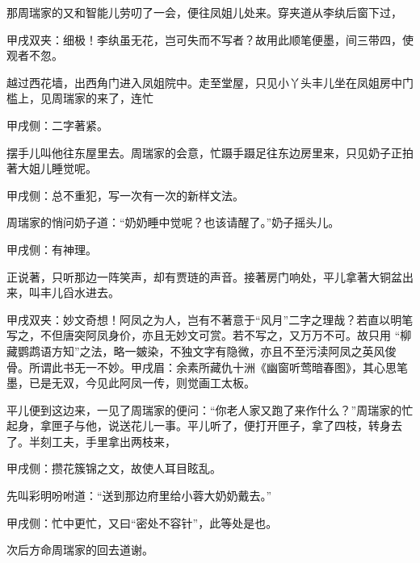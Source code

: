 \begin{parag}
    那周瑞家的又和智能儿劳叨了一会，便往凤姐儿处来。穿夹道从李纨后窗下过，\begin{note}甲戌双夹：细极！李纨虽无花，岂可失而不写者？故用此顺笔便墨，间三带四，使观者不忽。\end{note}越过西花墙，出西角门进入凤姐院中。走至堂屋，只见小丫头丰儿坐在凤姐房中门槛上，见周瑞家的来了，连忙\begin{note}甲戌侧：二字著紧。\end{note}摆手儿叫他往东屋里去。周瑞家的会意，忙蹑手蹑足往东边房里来，只见奶子正拍著大姐儿睡觉呢。\begin{note}甲戌侧：总不重犯，写一次有一次的新样文法。\end{note}周瑞家的悄问奶子道：“奶奶睡中觉呢？也该请醒了。”奶子摇头儿。\begin{note}甲戌侧：有神理。\end{note}正说著，只听那边一阵笑声，却有贾琏的声音。接著房门响处，平儿拿著大铜盆出来，叫丰儿舀水进去。\begin{note}甲戌双夹：妙文奇想！阿凤之为人，岂有不著意于“风月”二字之理哉？若直以明笔写之，不但唐突阿凤身价，亦且无妙文可赏。若不写之，又万万不可。故只用 “柳藏鹦鹉语方知”之法，略一皴染，不独文字有隐微，亦且不至污渎阿凤之英风俊骨。所谓此书无一不妙。甲戌眉：余素所藏仇十洲《幽窗听莺暗春图》，其心思笔墨，已是无双，今见此阿凤一传，则觉画工太板。\end{note}平儿便到这边来，一见了周瑞家的便问：“你老人家又跑了来作什么？”周瑞家的忙起身，拿匣子与他，说送花儿一事。平儿听了，便打开匣子，拿了四枝，转身去了。半刻工夫，手里拿出两枝来，\begin{note}甲戌侧：攒花簇锦之文，故使人耳目眩乱。\end{note}先叫彩明吩咐道：“送到那边府里给小蓉大奶奶戴去。”\begin{note}甲戌侧：忙中更忙，又曰“密处不容针”，此等处是也。\end{note}次后方命周瑞家的回去道谢。
\end{parag}


